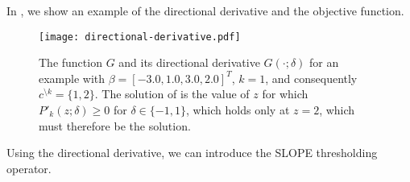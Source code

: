 





In , we show an example of the directional
derivative and the objective function.

\begin{figure}[htb]
  \centering
  \texttt{[image: directional-derivative.pdf]}
  \caption{%
  The function \(G\) and its directional derivative \(G( \cdot ; \delta)\) for
  an example with \(\beta = [-3.0, 1.0, 3.0, 2.0]^T\), \(k = 1\), and consequently
  \(c^{\setminus k} = \{1, 2\}\). The solution of  is the value of \(z\) for
      which \(P'_k(z; \delta) \geq 0 \) for \(\delta \in \{-1, 1\}\), which holds only
      at \(z = 2\), which must therefore be the solution.
    }
  \label{fig:directional-derivative}
\end{figure}

Using the directional derivative, we can introduce the SLOPE thresholding operator.

